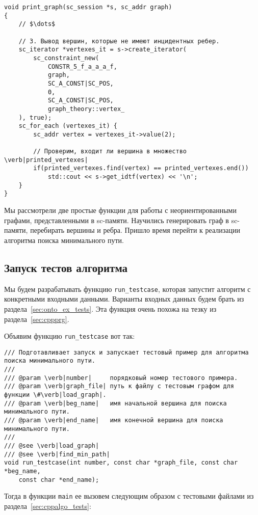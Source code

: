 \begin{lstlisting}[texcl]
void print_graph(sc_session *s, sc_addr graph)
{
    // $\dots$

    // 3. Вывод вершин, которые не имеют инцидентных ребер.
    sc_iterator *vertexes_it = s->create_iterator(
        sc_constraint_new(
            CONSTR_5_f_a_a_a_f,
            graph,
            SC_A_CONST|SC_POS,
            0,
            SC_A_CONST|SC_POS,
            graph_theory::vertex_
    ), true);
    sc_for_each (vertexes_it) {
        sc_addr vertex = vertexes_it->value(2);

        // Проверим, входит ли вершина в множество \verb|printed_vertexes|
        if(printed_vertexes.find(vertex) == printed_vertexes.end())
            std::cout << s->get_idtf(vertex) << '\n';
    }
}
\end{lstlisting}

Мы рассмотрели две простые функции для работы с неориентированными
графами, представленными в sc-памяти. Научились генерировать граф в
sc-памяти, перебирать вершины и ребра. Пришло время перейти к
реализации алгоритма поиска минимального пути.

\subsection{Запуск тестов алгоритма}
\label{sec:libscprg_run_testcase}

Мы будем разрабатывать функцию \lstinline|run_testcase|, которая
запустит алгоритм с конкретными входными данными. Варианты входных
данных будем брать из раздела~\ref{sec:onto_ex_tests}. Эта функция
очень похожа на тезку из раздела~\ref{sec:cppprg}.

Объявим функцию \lstinline|run_testcase| вот так:

\begin{lstlisting}[texcl]
/// Подготавливает запуск и запускает тестовый пример для алгоритма поиска минимального пути.
///
/// @param \verb|number|     порядковый номер тестового примера.
/// @param \verb|graph_file| путь к файлу с тестовым графом для функции \#\verb|load_graph|.
/// @param \verb|beg_name|   имя начальной вершина для поиска минимального пути.
/// @param \verb|end_name|   имя конечной вершина для поиска минимального пути.
///
/// @see \verb|load_graph|
/// @see \verb|find_min_path|
void run_testcase(int number, const char *graph_file, const char *beg_name,
    const char *end_name);
\end{lstlisting}

Тогда в функции \lstinline|main| ее вызовем следующим образом с
тестовыми файлами из раздела~\ref{sec:cppalgo_tests}:

